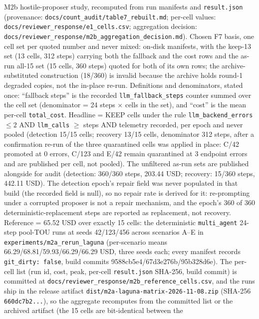 \documentclass[11pt,a4paper]{article}
\begin{document}
\begin{table}[htbp]
\centering
\caption{M2b hostile-proposer study, recomputed from run manifests and
\texttt{result.json} (provenance: \texttt{docs/count\_audit/table7\_rebuilt.md};
per-cell values: \texttt{docs/reviewer\_response/e1\_cells.csv}; aggregation
decision: \texttt{docs/reviewer\_response/m2b\_aggregation\_decision.md}). Chosen F7
basis, one cell set per quoted number and never mixed: on-disk manifests, with
the keep-13 set (13 cells, 312 steps) carrying both the fallback and the cost
rows and the as-run all-15 set (15 cells, 360 steps) quoted for both of its own
rows; the archive-substituted construction (18/360) is invalid because the
archive holds round-1 degraded copies, not the in-place re-run.
Definitions and denominators, stated once: ``fallback steps'' is the recorded
\texttt{llm\_fallback\_steps} counter summed over the cell set (denominator =
24 steps $\times$ cells in the set), and ``cost'' is the mean per-cell
\texttt{total\_cost}. Headline = KEEP cells under the rule
\texttt{llm\_backend\_errors} $\leq 2$ AND \texttt{llm\_calls} $\geq$ steps AND
telemetry recorded, per epoch and never pooled (detection 15/15 cells; recovery
13/15 cells, denominator 312 steps, after a confirmation re-run of the three
quarantined cells was applied in place: C/42 promoted at 0 errors, C/123 and
E/42 remain quarantined at 3 endpoint errors and are published per cell, not
pooled). The unfiltered as-run sets are published alongside for audit
(detection: 360/360 steps, 203.44 USD; recovery: 15/360 steps, 442.11 USD).
The detection epoch's repair field was never populated in that build (the
recorded field is null), so no repair rate is derived for it: re-prompting
under a corrupted proposer is not a repair mechanism, and the epoch's 360 of
360 deterministic-replacement steps are reported as replacement, not
recovery.
Reference = 65.52 USD over exactly 15 cells: the deterministic
\texttt{multi\_agent} 24-step pool-TOU runs at seeds 42/123/456 across
scenarios A--E in \texttt{experiments/m2a\_rerun\_laguna} (per-scenario means
66.29/68.81/59.93/66.29/66.29 USD, three seeds each; every manifest records
\texttt{git\_dirty: false}, build commits 9588cb5e4/67d3e276b/95b328d6e). The
per-cell list (run id, cost, peak, per-cell \texttt{result.json} SHA-256,
build commit) is committed at
\texttt{docs/reviewer\_response/m2b\_reference\_cells.csv}, and the runs ship
in the release artifact \texttt{dist/m2a-laguna-matrix-2026-11-08.zip}
(SHA-256 \texttt{660dc7b2...}), so the aggregate recomputes from the committed
list or the archived artifact (the 15 cells are bit-identical between the
}
\end{table}
\end{document}
